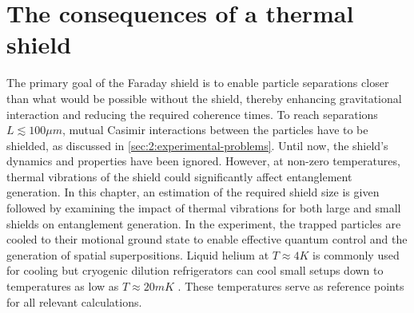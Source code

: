 \chapter{The consequences of a thermal shield}\label{cha:the-shield}
The primary goal of the Faraday shield is to enable particle separations closer than what would be possible without the shield, thereby enhancing gravitational interaction and reducing the required coherence times.
To reach separations $L \lesssim 100\si{\mu m}$, mutual Casimir interactions between the particles have to be shielded, as discussed in \cref{sec:2:experimental-problems}.
Until now, the shield's dynamics and properties have been ignored. However, at non-zero temperatures, thermal vibrations of the shield could significantly affect entanglement generation.
In this chapter, an estimation of the required shield size is given followed by examining the impact of thermal vibrations for both large and small shields on entanglement generation.
In the experiment, the trapped particles are cooled to their motional ground state to enable effective quantum control and the generation of spatial superpositions.
Liquid helium at $T \approx 4\si{K}$ is commonly used for cooling but cryogenic dilution refrigerators can cool small setups down to temperatures as low as $T \approx 20\si{mK}$ \cite{Zu_2022}.
These temperatures serve as reference points for all relevant calculations.








